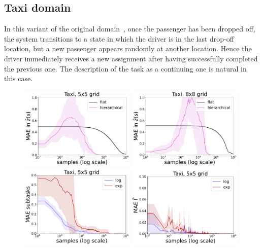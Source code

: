   \subsection{Taxi domain}
  In this variant of the original domain~\citep{Dietterich2000}, once the passenger has been dropped off, the system transitions to a state in which the driver is in the last drop-off location, but a new passenger appears randomly at another location. Hence the driver immediately receives a new assignment after having successfully completed the previous one. The description of the task as a continuing one is natural in this case.
  \begin{figure}[!hb]
    \begin{center}
        \includegraphics*[width=0.49\textwidth]{figures/chapter2/online/taxi_5.pdf}
        \includegraphics*[width=0.49\textwidth]{figures/chapter2/online/taxi_8.pdf}
        \includegraphics*[width=0.49\textwidth]{figures/chapter2/online/taxi_5_subtask.pdf}
        \includegraphics*[width=0.49\textwidth]{figures/chapter2/online/taxi_5_gammas.pdf}

\end{center}
\end{figure}
